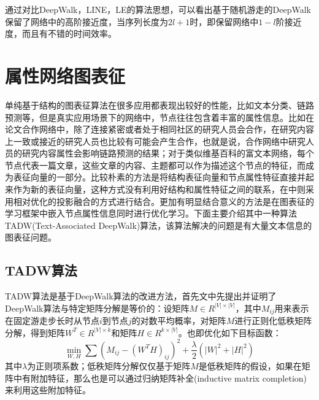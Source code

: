 通过对比DeepWalk，LINE，LE的算法思想，可以看出基于随机游走的DeepWalk保留了网络中的高阶接近度，当序列长度为$2l+1$时，即保留网络中$1-l$阶接近度，而且有不错的时间效率。
\section{属性网络图表征}
单纯基于结构的图表征算法在很多应用都表现出较好的性能，比如文本分类、链路预测等，但是真实应用场景下的网络中，节点往往包含着丰富的属性信息。比如在论文合作网络中，除了连接紧密或者处于相同社区的研究人员会合作，在研究内容上一致或接近的研究人员也比较有可能会产生合作，也就是说，合作网络中研究人员的研究内容属性会影响链路预测的结果；对于类似维基百科的富文本网络，每个节点代表一篇文章，这些文章的内容、主题都可以作为描述这个节点的特征，而成为表征向量的一部分。比较朴素的方法是将结构表征向量和节点属性特征直接并起来作为新的表征向量，这种方式没有利用好结构和属性特征之间的联系，在\cite{li2017attributed}中则采用相对优化的投影融合的方式进行结合。更加有明显结合意义的方法是在图表征的学习框架中嵌入节点属性信息同时进行优化学习。下面主要介绍其中一种算法TADW(Text-Associated DeepWalk)算法，该算法解决的问题是有大量文本信息的图表征问题。

\subsection{TADW算法}
TADW算法是基于DeepWalk算法的改进方法，首先文中先提出并证明了DeepWalk算法与特定矩阵分解是等价的：设矩阵$M\in R^{|V|\times |V|}$，其中$M_{ij}$用来表示在固定游走步长时从节点$i$到节点$j$的对数平均概率，对矩阵$M$进行正则化低秩矩阵分解\cite{yu2014large}，得到矩阵$W^T \in R^{|V| \times k}$和矩阵$H \in R^{k\times |V|}$。也即优化如下目标函数：
\begin{equation}
	\min_{W,H} \sum(M_{ij}-(W^TH)_{ij})^2 +\frac{\lambda}{2}(|W|^2+|H|^2)
\end{equation}
其中$\lambda$为正则项系数；低秩矩阵分解仅仅基于矩阵$M$是低秩矩阵的假设，如果在矩阵中有附加特征，那么也是可以通过归纳矩阵补全(inductive matrix completion)\cite{natarajan2014inductive}来利用这些附加特征。

